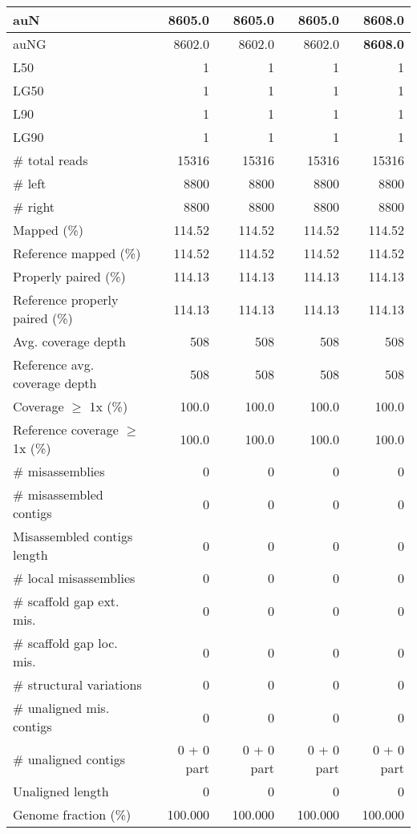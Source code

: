 \documentclass[12pt,a4paper]{article}
\begin{document}
\begin{table}[ht]
\begin{center}
\begin{tabular}{|l*{4}{|r}|}
auN & 8605.0 & 8605.0 & 8605.0 & {\bf 8608.0} \\ \hline
auNG & 8602.0 & 8602.0 & 8602.0 & {\bf 8608.0} \\ \hline
L50 & 1 & 1 & 1 & 1 \\ \hline
LG50 & 1 & 1 & 1 & 1 \\ \hline
L90 & 1 & 1 & 1 & 1 \\ \hline
LG90 & 1 & 1 & 1 & 1 \\ \hline
\# total reads & 15316 & 15316 & 15316 & 15316 \\ \hline
\# left & 8800 & 8800 & 8800 & 8800 \\ \hline
\# right & 8800 & 8800 & 8800 & 8800 \\ \hline
Mapped (\%) & 114.52 & 114.52 & 114.52 & 114.52 \\ \hline
Reference mapped (\%) & 114.52 & 114.52 & 114.52 & 114.52 \\ \hline
Properly paired (\%) & 114.13 & 114.13 & 114.13 & 114.13 \\ \hline
Reference properly paired (\%) & 114.13 & 114.13 & 114.13 & 114.13 \\ \hline
Avg. coverage depth & 508 & 508 & 508 & 508 \\ \hline
Reference avg. coverage depth & 508 & 508 & 508 & 508 \\ \hline
Coverage $\geq$ 1x (\%) & 100.0 & 100.0 & 100.0 & 100.0 \\ \hline
Reference coverage $\geq$ 1x (\%) & 100.0 & 100.0 & 100.0 & 100.0 \\ \hline
\# misassemblies & 0 & 0 & 0 & 0 \\ \hline
\# misassembled contigs & 0 & 0 & 0 & 0 \\ \hline
Misassembled contigs length & 0 & 0 & 0 & 0 \\ \hline
\# local misassemblies & 0 & 0 & 0 & 0 \\ \hline
\# scaffold gap ext. mis. & 0 & 0 & 0 & 0 \\ \hline
\# scaffold gap loc. mis. & 0 & 0 & 0 & 0 \\ \hline
\# structural variations & 0 & 0 & 0 & 0 \\ \hline
\# unaligned mis. contigs & 0 & 0 & 0 & 0 \\ \hline
\# unaligned contigs & 0 + 0 part & 0 + 0 part & 0 + 0 part & 0 + 0 part \\ \hline
Unaligned length & 0 & 0 & 0 & 0 \\ \hline
Genome fraction (\%) & 100.000 & 100.000 & 100.000 & 100.000 \\ \hline

\end{tabular}
\end{center}
\end{table}
\end{document}
